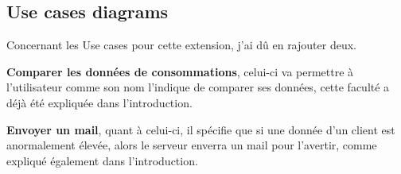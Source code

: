 \subsection{Use cases diagrams}

\begin{flushleft}
Concernant les Use cases pour cette extension, j'ai dû en rajouter deux.
\end{flushleft}

\begin{flushleft}
\textbf{Comparer les données de consommations}, celui-ci va permettre à l'utilisateur comme son nom l'indique de comparer ses données, cette faculté a déjà été expliquée dans l'introduction.
\end{flushleft}

\begin{flushleft}
\textbf{Envoyer un mail}, quant à celui-ci, il spécifie que si une donnée d'un client est anormalement élevée, alors le serveur enverra un mail pour l'avertir, comme expliqué également dans l'introduction.
\end{flushleft}


